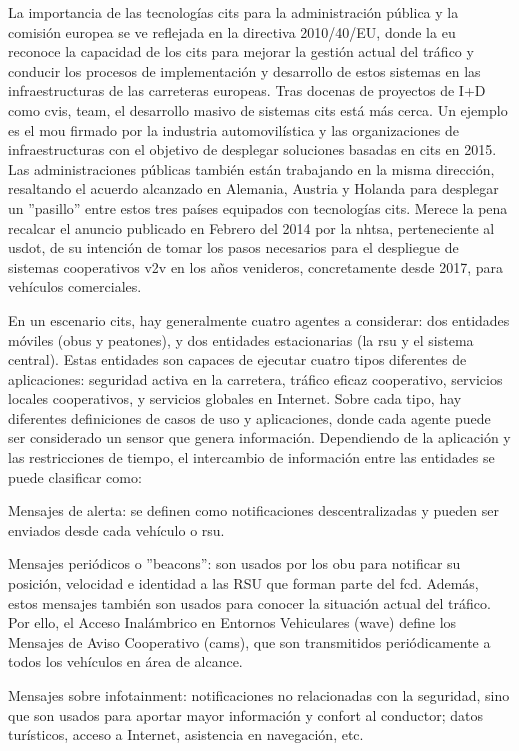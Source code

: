 La importancia de las tecnologías \gls{cits} para la administración pública y la comisión europea se ve reflejada en la directiva 2010/40/EU, donde la \gls{eu} reconoce la capacidad de los \gls{cits} para mejorar la gestión actual del tráfico y conducir los procesos de implementación y desarrollo de estos sistemas en las infraestructuras de las carreteras europeas. Tras docenas de proyectos de I+D como \gls{cvis}, \gls{team}, el desarrollo masivo de sistemas \gls{cits} está más cerca. Un ejemplo es el \gls{mou} firmado por la industria automovilística y las organizaciones de infraestructuras con el objetivo de desplegar soluciones basadas en \gls{cits} en 2015. Las administraciones públicas también están trabajando en la misma dirección, resaltando el acuerdo alcanzado en Alemania, Austria y Holanda para desplegar un ''pasillo'' entre estos tres países equipados con tecnologías \gls{cits}. Merece la pena recalcar el anuncio publicado en Febrero del 2014 por la \gls{nhtsa}, perteneciente al \gls{usdot}, de su intención de tomar los pasos necesarios para el despliegue de sistemas cooperativos \gls{v2v} en los años venideros, concretamente desde 2017, para vehículos comerciales.

En un escenario \gls{cits}, hay generalmente cuatro agentes a considerar: dos entidades móviles (\gls{obu}s y peatones), y dos entidades estacionarias (la \gls{rsu} y el sistema central). Estas entidades son capaces de ejecutar cuatro tipos diferentes de aplicaciones: seguridad activa en la carretera, tráfico eficaz cooperativo, servicios locales cooperativos, y servicios globales en Internet. Sobre cada tipo, hay diferentes definiciones de casos de uso y aplicaciones, donde cada agente puede ser considerado un sensor que genera información. Dependiendo de la aplicación y las restricciones de  tiempo, el intercambio de información entre las entidades se puede clasificar como:

\begin{description}
	\item Mensajes de alerta: se definen como notificaciones descentralizadas y pueden ser enviados desde cada vehículo o \gls{rsu}.

	\item Mensajes periódicos o ''beacons'': son usados por los \gls{obu} para notificar su posición, velocidad e identidad a las RSU que forman parte del \gls{fcd}. Además, estos mensajes también son usados para conocer la situación	actual del tráfico. Por ello, el Acceso Inalámbrico en Entornos Vehiculares (\gls{wave})	define los Mensajes de Aviso Cooperativo (\gls{cam}s), que son transmitidos periódicamente	a todos los vehículos en área de alcance.

	\item Mensajes sobre infotainment: notificaciones no relacionadas con la seguridad, sino que son usados para aportar mayor información y confort al conductor; datos turísticos, acceso a Internet, asistencia en navegación, etc.
\end{description}

